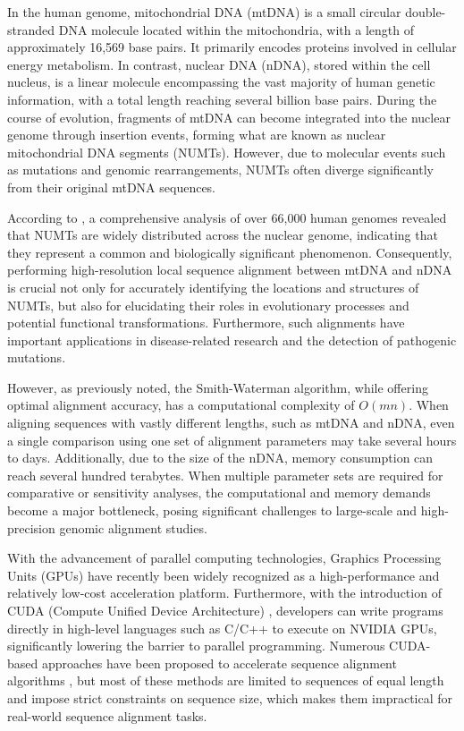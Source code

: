 \documentclass[PhD]{PHlab-thesis}
\begin{document}
In the human genome, mitochondrial DNA (mtDNA) is a small circular double-stranded DNA molecule located within the mitochondria, with a length of approximately 16,569 base pairs. It primarily encodes proteins involved in cellular energy metabolism. In contrast, nuclear DNA (nDNA), stored within the cell nucleus, is a linear molecule encompassing the vast majority of human genetic information, with a total length reaching several billion base pairs. During the course of evolution, fragments of mtDNA can become integrated into the nuclear genome through insertion events, forming what are known as nuclear mitochondrial DNA segments (NUMTs). However, due to molecular events such as mutations and genomic rearrangements, NUMTs often diverge significantly from their original mtDNA sequences.

According to \cite{NUMTs1}, a comprehensive analysis of over 66,000 human genomes revealed that NUMTs are widely distributed across the nuclear genome, indicating that they represent a common and biologically significant phenomenon. Consequently, performing high-resolution local sequence alignment between mtDNA and nDNA is crucial not only for accurately identifying the locations and structures of NUMTs, but also for elucidating their roles in evolutionary processes and potential functional transformations. Furthermore, such alignments have important applications in disease-related research and the detection of pathogenic mutations.

However, as previously noted, the Smith-Waterman algorithm, while offering optimal alignment accuracy, has a computational complexity of $O(mn)$. When aligning sequences with vastly different lengths, such as mtDNA and nDNA, even a single comparison using one set of alignment parameters may take several hours to days. Additionally, due to the size of the nDNA, memory consumption can reach several hundred terabytes. When multiple parameter sets are required for comparative or sensitivity analyses, the computational and memory demands become a major bottleneck, posing significant challenges to large-scale and high-precision genomic alignment studies.

With the advancement of parallel computing technologies, Graphics Processing Units (GPUs) have recently been widely recognized as a high-performance and relatively low-cost acceleration platform. Furthermore, with the introduction of CUDA (Compute Unified Device Architecture) \cite{CUDA1, CUDA2}, developers can write programs directly in high-level languages such as C/C++ to execute on NVIDIA GPUs, significantly lowering the barrier to parallel programming. Numerous CUDA-based approaches have been proposed to accelerate sequence alignment algorithms \cite{CUDA4, CUDA5}, but most of these methods are limited to sequences of equal length and impose strict constraints on sequence size, which makes them impractical for real-world sequence alignment tasks.
\end{document}
